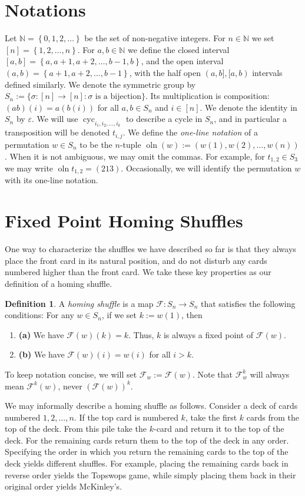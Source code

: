 \documentclass[final,nomarks]{dmtcs-episciences}
\theoremstyle{definition}
\theoremstyle{definition}
\newtheorem{defn}[thm]{Definition}
\theoremstyle{remark}
\newcommand{\f}{\mathcal{F}} %
\newcommand{\fw}{\mathcal{F}_w} %
\newcommand{\NN}{\mathbb{N}}
\newcommand{\tup}[1]{\left( #1 \right)}
\newcommand{\set}[1]{\left\{ #1 \right\}}
\newcommand{\cyc}[1]{\operatorname{cyc}_{#1}}
\newcommand{\oln}{\operatorname{oln}}
\begin{document}
\section{Notations}
Let $\NN = \set{0,1,2,\ldots}$ be the set of non-negative integers.
For $n \in \NN$ we set $[n] = \set{1,2,\ldots,n}$.
For $a,b \in \NN$ we define the closed interval $[a,b] = \set{a,a+1,a+2,\ldots,b-1,b}$, and the open interval $(a,b) = \set{a+1,a+2,\ldots,b-1}$, with the half open $(a,b],[a,b)$ intervals defined similarly.
We denote the symmetric group by $S_n := \{\sigma : [n] \to [n] : \sigma \text{ is a bijection}\}$.
Its multiplication is composition: $(ab)(i) = a(b(i))$ for all $a, b \in S_n$ and $i \in [n]$.
We denote the identity in $S_n$ by $\varepsilon$.
We will use $ \cyc{i_{1},i_{2},\dots,i_{k}} $ to describe a cycle in $ S_{n} $, and in particular a transposition will be denoted $ t_{i,j} $.
We define the \emph{one-line notation} of a permutation $ w \in S_{n} $ to be the $n$-tuple $ \oln\tup{w} :=  \tup{ w\tup{ 1 },w\tup{ 2 },\dots,w\tup{ n } }$. When it is not ambiguous, we may omit the commas. For example, for $t_{1,2} \in S_3$ we may write $\oln{t_{1,2}}=\tup{213}$. Occasionally, we will identify the permutation $w$ with its one-line notation.


\section{Fixed Point Homing Shuffles}

One way to characterize the shuffles we have described so far is that they always place the front card in its natural position, and do not disturb any cards numbered higher than the front card. We take these key properties as our definition of a homing shuffle.

\begin{defn}
    \label{shufDef}
    A \emph{homing shuffle} is a map $ \f : S_{n} \to S_{n} $ that satisfies the following conditions: For any $ w \in S_{n} $, if we set $ k := w\tup{ 1 } $, then
    \begin{enumerate}[]
        \item\textbf{(a)} We have $ \f\tup{ w }\tup{ k } = k $. Thus, $ k $ is always a fixed point of $ \f\tup{ w } $.
        \item\textbf{(b)} We have $ \f\tup{ w }\tup{ i } = w\tup{ i } $ for all $ i > k $.
    \end{enumerate}
    To keep notation concise, we will set $\fw := \f\tup{w} $. Note that $\f^k_w$ will always mean $\f^k\tup{w}$, never $\tup{\f\tup{w}}^k$.
\end{defn}
We may informally describe a homing shuffle as follows. Consider a deck of cards numbered $1,2,\dots,n$. If the top card is numbered $k$, take the first $k$ cards from the top of the deck. From this pile take the $k$-card and return it to the top of the deck. For the remaining cards return them to the top of the deck in any order. Specifying the order in which you return the remaining cards to the top of the deck yields different shuffles. For example, placing the remaining cards back in reverse order yields the Topswops game, while simply placing them back in their original order yields McKinley's.
\end{document}

